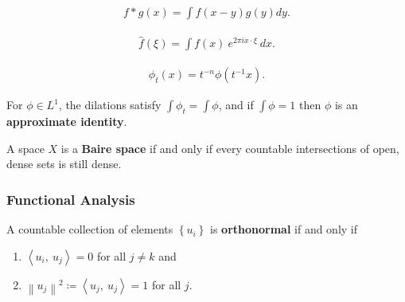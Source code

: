 \begin{definition}[Convolution]

\begin{align*}f * g(x)=\int f(x-y) g(y) d y .\end{align*}

\end{definition}

\begin{definition}

\begin{align*}
\widehat{f}(\xi) = \int f(x) ~e^{2\pi i x \cdot \xi} ~dx
.\end{align*}

\end{definition}

\begin{definition}[Dilation]

\begin{align*}
\phi_{t}(x) = t^{-n} \phi\left(t^{-1} x\right)
.\end{align*}

\end{definition}

\begin{definition}

For \(\phi\in L^1\), the dilations satisfy
\(\int \phi_{t} = \int \phi\), and if \(\int \phi = 1\) then \(\phi\) is
an \textbf{approximate identity}.

\end{definition}

\begin{definition}

A space \(X\) is a \textbf{Baire space} if and only if every countable
intersections of open, dense sets is still dense.

\end{definition}

\hypertarget{functional-analysis}{%
\subsubsection{Functional Analysis}\label{functional-analysis}}

\begin{definition}

A countable collection of elements \(\left\{{ u_i }\right\}\) is
\textbf{orthonormal} if and only if

\begin{enumerate}
\def\labelenumi{\arabic{enumi}.}
\tightlist
\item
  \({\left\langle {u_i},~{u_j} \right\rangle} = 0\) for all \(j \neq k\)
  and
\item
  \({\left\lVert {u_j} \right\rVert}^2 \coloneqq{\left\langle {u_j},~{u_j} \right\rangle} = 1\)
  for all \(j\).
\end{enumerate}

\end{definition}

